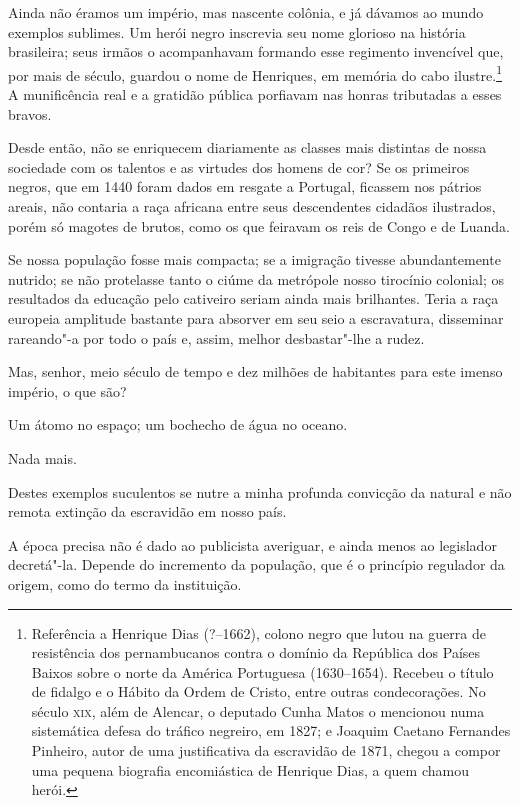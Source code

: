 \begin{linenumbers}
Ainda não éramos um império, mas nascente colônia, e já dávamos ao mundo
exemplos sublimes. Um herói negro inscrevia seu nome glorioso na
história brasileira; seus irmãos o acompanhavam formando esse regimento
invencível que, por mais de século, guardou o nome de Henriques, em
memória do cabo
ilustre.\footnote{ Referência a Henrique Dias (?--1662), colono negro que lutou na 
guerra de resistência dos pernambucanos contra o domínio da República dos Países Baixos 
sobre o norte da América Portuguesa (1630--1654). Recebeu o título de fidalgo e o Hábito 
da Ordem de Cristo, entre outras condecorações. No século \textsc{xix}, além de Alencar, o deputado 
Cunha Matos o mencionou numa sistemática defesa do tráfico negreiro, em 1827; e Joaquim 
Caetano Fernandes Pinheiro, autor de uma justificativa da escravidão de 1871, chegou a 
compor uma pequena biografia encomiástica de Henrique Dias, a quem chamou herói.}
A munificência real e a gratidão pública porfiavam nas honras tributadas a esses bravos.

Desde então, não se enriquecem diariamente as classes mais distintas de
nossa sociedade com os talentos e as virtudes dos homens de cor? Se os
primeiros negros, que em 1440 foram dados em resgate a Portugal,
ficassem nos pátrios areais, não contaria a raça africana entre seus
descendentes cidadãos ilustrados, porém só magotes de brutos, como os
que feiravam os reis de Congo e de Luanda. 

Se nossa população fosse mais compacta; se a imigração tivesse
abundantemente nutrido; se não protelasse tanto o ciúme da metrópole
nosso tirocínio colonial; os resultados da educação pelo cativeiro
seriam ainda mais brilhantes. Teria a raça europeia amplitude bastante
para absorver em seu seio a escravatura, disseminar rareando"-a por
todo o país e, assim, melhor desbastar"-lhe a rudez. 

Mas, senhor, meio século de tempo e dez milhões de habitantes para este
imenso império, o que são?

Um átomo no espaço; um bochecho de água no oceano. 

Nada mais.

Destes exemplos suculentos se nutre a minha profunda convicção da
natural e não remota extinção da escravidão em nosso país.

A época precisa não é dado ao publicista averiguar, e ainda menos ao
legislador decretá"-la. Depende do incremento da população, que é o
princípio regulador da origem, como do termo da instituição.


\end{linenumbers}
